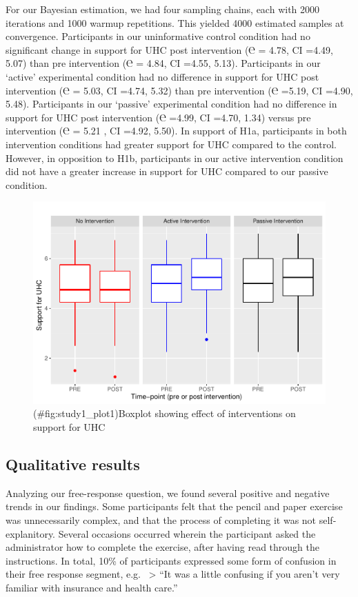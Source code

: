 \documentclass[
  english,
  man]{apa6}
\begin{document}
For our Bayesian estimation, we had four sampling chains, each with 2000 iterations and 1000 warmup repetitions. This yielded 4000 estimated samples at convergence. Participants in our uninformative control condition had no significant change in support for UHC post intervention (℮ = 4.78, CI =4.49, 5.07) than pre intervention (℮ = 4.84, CI =4.55, 5.13). Participants in our `active' experimental condition had no difference in support for UHC post intervention (℮ = 5.03, CI =4.74, 5.32) than pre intervention (℮ =5.19, CI =4.90, 5.48). Participants in our `passive' experimental condition had no difference in support for UHC post intervention (℮ =4.99, CI =4.70, 1.34) versus pre intervention (℮ = 5.21 , CI =4.92, 5.50). In support of H1a, participants in both intervention conditions had greater support for UHC compared to the control. However, in opposition to H1b, participants in our active intervention condition did not have a greater increase in support for UHC compared to our passive condition.

\begin{figure}
\centering
\includegraphics{primary_files/figure-latex/study1_plot1-1.pdf}
\caption{(\#fig:study1\_plot1)Boxplot showing effect of interventions on support for UHC}
\end{figure}

\hypertarget{qualitative-results}{%
\subsection{Qualitative results}\label{qualitative-results}}

Analyzing our free-response question, we found several positive and negative trends in our findings. Some participants felt that the pencil and paper exercise was unnecessarily complex, and that the process of completing it was not self-explanitory. Several occasions occurred wherein the participant asked the administrator how to complete the exercise, after having read through the instructions. In total, 10\% of participants expressed some form of confusion in their free response segment, e.g.~
\textgreater{} ``It was a little confusing if you aren't very familiar with insurance and health care.''
\end{document}
